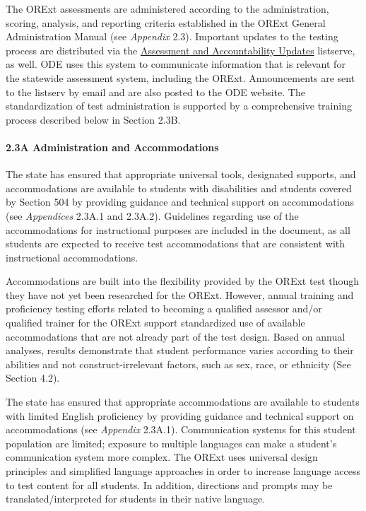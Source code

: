 \documentclass[]{article}
\let\oldparagraph\paragraph
\renewcommand{\paragraph}[1]{\oldparagraph{#1}\mbox{}}
\begin{document}
The ORExt assessments are administered according to the administration,
scoring, analysis, and reporting criteria established in the ORExt
General Administration Manual (see \emph{Appendix} 2.3). Important
updates to the testing process are distributed via the
\color{link}\href{http://www.oregon.gov/ode/educator-resources/assessment/Pages/Assessment-and-Accountability-Update.aspx}{Assessment
and Accountability Updates} \color{black} listserve, as well. ODE uses
this system to communicate information that is relevant for the
statewide assessment system, including the ORExt. Announcements are sent
to the listserv by email and are also posted to the ODE website. The
standardization of test administration is supported by a comprehensive
training process described below in Section 2.3B.

\hypertarget{a-administration-and-accommodations}{%
\paragraph{2.3A Administration and
Accommodations}\label{a-administration-and-accommodations}}

The state has ensured that appropriate universal tools, designated
supports, and accommodations are available to students with disabilities
and students covered by Section 504 by providing guidance and technical
support on accommodations (see \emph{Appendices} 2.3A.1 and 2.3A.2).
Guidelines regarding use of the accommodations for instructional
purposes are included in the document, as all students are expected to
receive test accommodations that are consistent with instructional
accommodations.

Accommodations are built into the flexibility provided by the ORExt test
though they have not yet been researched for the ORExt. However, annual
training and proficiency testing efforts related to becoming a qualified
assessor and/or qualified trainer for the ORExt support standardized use
of available accommodations that are not already part of the test
design. Based on annual analyses, results demonstrate that student
performance varies according to their abilities and not
construct-irrelevant factors, such as sex, race, or ethnicity (See
Section 4.2).

The state has ensured that appropriate accommodations are available to
students with limited English proficiency by providing guidance and
technical support on accommodations (see \emph{Appendix} 2.3A.1).
Communication systems for this student population are limited; exposure
to multiple languages can make a student's communication system more
complex. The ORExt uses universal design principles and simplified
language approaches in order to increase language access to test content
for all students. In addition, directions and prompts may be
translated/interpreted for students in their native language.
\end{document}
